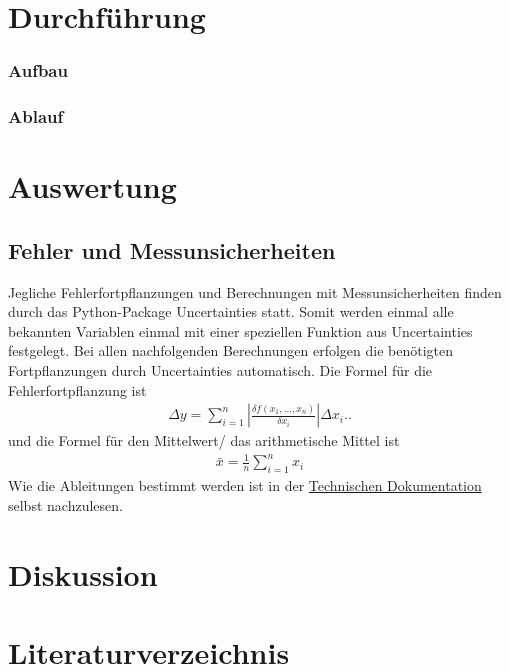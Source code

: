 \documentclass[12pt]{article}
\begin{document}
\section{Durchführung}\label{sec:durchfuhrung}
\subsubsection{Aufbau}
\subsubsection{Ablauf}

\section{Auswertung}\label{sec:auswertung}
\subsection{Fehler und Messunsicherheiten}\label{subsec:fehler-und-messunsicherheiten}
Jegliche Fehlerfortpflanzungen und Berechnungen mit Messunsicherheiten finden durch das Python-Package Uncertainties\cite{uncertainties} statt. Somit werden einmal alle bekannten Variablen einmal mit einer speziellen Funktion aus Uncertainties festgelegt. Bei allen nachfolgenden Berechnungen erfolgen die benötigten Fortpflanzungen durch Uncertainties automatisch. Die Formel für die Fehlerfortpflanzung ist 
\begin{align}
  \Delta y=\sum_{i=1}^n\left|\frac{\delta f\left(x_1, \ldots, x_n\right)}{\delta x_i}\right| \Delta x_i.\text{.}\label{gauss}
\end{align}
und die Formel für den Mittelwert/ das arithmetische Mittel ist
\begin{align}
  \bar{x}=\frac{1}{n}\sum_{i=1}^n x_i\label{mittel}
\end{align}
Wie die Ableitungen bestimmt werden ist in der \href{https://readthedocs.org/projects/uncertainties-python-package/downloads/pdf/latest/}{Technischen Dokumentation} selbst nachzulesen.

\section{Diskussion}\label{sec:diskussion}
\newpage

\section{Literaturverzeichnis}\label{sec:literaturverzeichnis}
\printbibliography[heading = none]
\newpage
\end{document}
